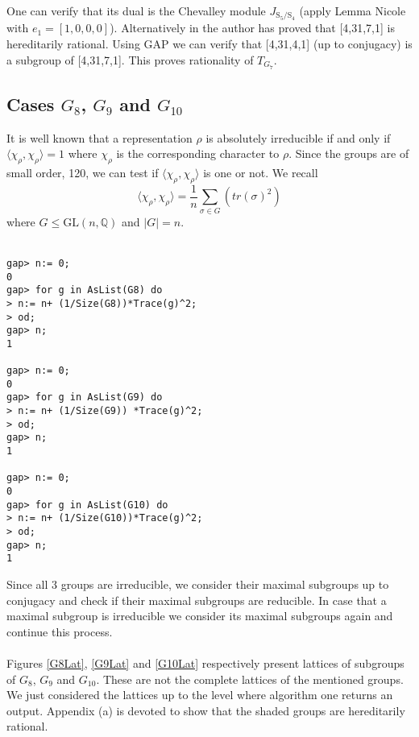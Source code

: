 \documentclass{article}
\theoremstyle{plain}
\theoremstyle{definition}
\newcommand{\Q}{\ensuremath{\mathbb{Q}}}
\begin{document}
One can verify that its dual is the Chevalley module $J_{\mathrm{S}_5/\mathrm{S}_4}$ (apply Lemma Nicole with $e_1 = [1,0,0,0] $).
Alternatively in \cite{Nicole1} the author has proved that [4,31,7,1] is hereditarily rational. Using GAP we can verify that [4,31,4,1] (up to conjugacy) is a subgroup of [4,31,7,1]. This proves rationality of $T_{G_7}$.

\subsection{Cases $G_8$, $G_9$ and $G_{10}$}
It is well known that a representation $\rho$ is absolutely irreducible if and only if $\langle \chi_{\rho},\chi_{\rho} \rangle =1 $ where $\chi_{\rho}$ is the corresponding character to $\rho$. Since the groups are of small order, 120, we can test if $\langle \chi_{\rho},\chi_{\rho} \rangle $ is one or not. We recall $$\langle \chi_{\rho},\chi_{\rho} \rangle = \frac{1}{n} \sum_{\sigma \in G} (tr(\sigma)^2)$$ where $G\leq \mathrm{GL}(n,\Q)$ and $|G| = n$.\\
\\
\begin{verbatim}
gap> n:= 0;
0
gap> for g in AsList(G8) do
> n:= n+ (1/Size(G8))*Trace(g)^2;
> od;
gap> n;
1

gap> n:= 0;
0
gap> for g in AsList(G9) do
> n:= n+ (1/Size(G9)) *Trace(g)^2;
> od;
gap> n;
1

gap> n:= 0;
0
gap> for g in AsList(G10) do
> n:= n+ (1/Size(G10))*Trace(g)^2;
> od;
gap> n;
1
\end{verbatim}
\noindent
Since all 3 groups are irreducible, we consider their maximal subgroups up to conjugacy and check if their maximal subgroups are reducible. In case that a maximal subgroup is irreducible we consider its maximal subgroups again and continue this process. \\
\\
Figures \ref{G8Lat}, \ref{G9Lat} and \ref{G10Lat} respectively present lattices of subgroups of $G_8$, $G_9$ and $G_{10}$. These are not the complete lattices of the mentioned groups. We just considered the lattices up to the level where algorithm one returns an output. Appendix (a) is devoted to show that the shaded groups are hereditarily rational.

\end{document}
